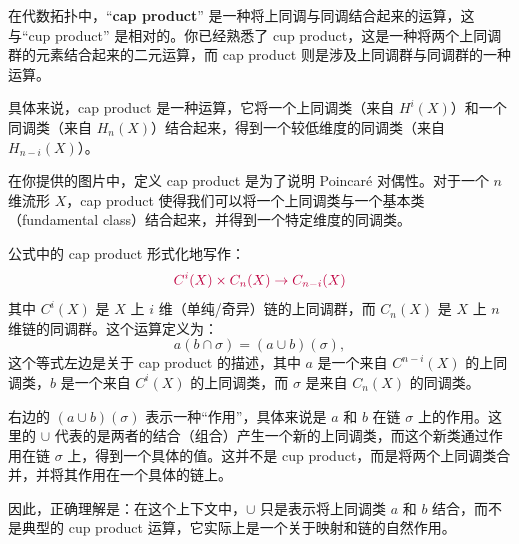 \documentclass[lang=cn,zihao=5,twoside,fontset=none]{textbook}
\begin{document}
在代数拓扑中，“\textbf{cap product}” 是一种将上同调与同调结合起来的运算，这与“cup product” 是相对的。你已经熟悉了 cup product，这是一种将两个上同调群的元素结合起来的二元运算，而 cap product 则是涉及上同调群与同调群的一种运算。

具体来说，cap product 是一种运算，它将一个上同调类（来自 $H^i(X)$）和一个同调类（来自 $H_n(X)$）结合起来，得到一个较低维度的同调类（来自 $H_{n-i}(X)$）。

在你提供的图片中，定义 cap product 是为了说明 Poincaré 对偶性。对于一个 $n$ 维流形 $X$，cap product 使得我们可以将一个上同调类与一个基本类（fundamental class）结合起来，并得到一个特定维度的同调类。

公式中的 cap product 形式化地写作：
$$
\color{purple}
C^i(X) \times C_n(X) \rightarrow C_{n-i}(X)
$$
其中 $C^i(X)$ 是 $X$ 上 $i$ 维（单纯/奇异）链的上同调群，而 $C_n(X)$ 是 $X$ 上 $n$ 维链的同调群。这个运算定义为：
$$
a(b \cap \sigma) = (a \cup b)(\sigma),
$$
这个等式左边是关于 cap product 的描述，其中 \( a \) 是一个来自 \( C^{n-i}(X) \) 的上同调类，\( b \) 是一个来自 \( C^i(X) \) 的上同调类，而 \( \sigma \) 是来自 \( C_n(X) \) 的同调类。

右边的 \( (a \cup b)(\sigma) \) 表示一种“作用”，具体来说是 \( a \) 和 \( b \) 在链 \( \sigma \) 上的作用。这里的 \( \cup \) 代表的是两者的结合（组合）产生一个新的上同调类，而这个新类通过作用在链 \( \sigma \) 上，得到一个具体的值。这并不是 cup product，而是将两个上同调类合并，并将其作用在一个具体的链上。

因此，正确理解是：在这个上下文中，\( \cup \) 只是表示将上同调类 \( a \) 和 \( b \) 结合，而不是典型的 cup product 运算，它实际上是一个关于映射和链的自然作用。
\end{document}
